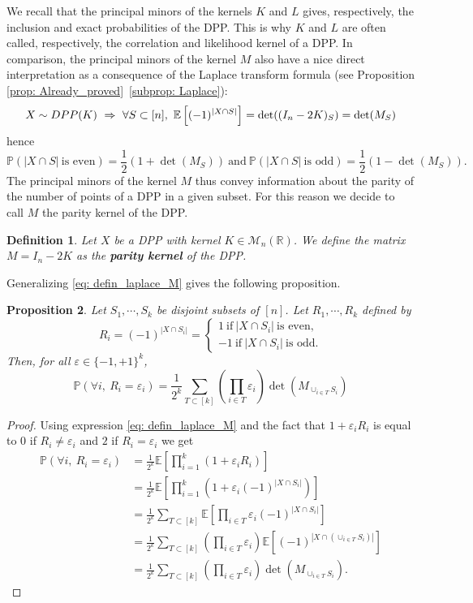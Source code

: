 \documentclass{article}
\numberwithin{equation}{section}
\renewcommand{\epsilon}{\varepsilon}
\newcommand{\bE}{\mathbb{E}}
\newcommand{\bR}{\mathbb{R}}
\newcommand{\cM}{\mathcal{M}}
\newcommand{\DPP}{\textnormal{DPP}}
\theoremstyle{plain}
\newtheorem{proposition}{Proposition}[section]
\newtheorem{definition}[proposition]{Definition}
\begin{document}
\noindent We recall that the principal minors of the kernels $K$ and $L$ gives, respectively, the inclusion and exact probabilities of the DPP. This is why $K$ and $L$ are often called, respectively, the correlation and likelihood kernel of a DPP. In comparison, the principal minors of the kernel $M$ also have a nice direct interpretation as a consequence of the Laplace transform formula (see Proposition \ref{prop: Already_proved}~\ref{subprop: Laplace}):
\begin{equation}\label{eq: defin_laplace_M}
X\sim \DPP(K)~\Rightarrow~\forall S\subset [n],~\bE\left[(-1)^{|X\cap S|}\right]=\det((I_n-2K)_S)=\det(M_S)
\end{equation}
hence
\[\mathbb{P}(|X\cap S|~\mbox{is even})= \frac{1}{2}(1+\det(M_S))~\mbox{and}~\mathbb{P}(|X\cap S|~\mbox{is odd})= \frac{1}{2}(1-\det(M_S)).\]
The principal minors of the kernel $M$ thus convey information about the parity of the number of points of a DPP in a given subset. For this reason we decide to call $M$ the parity kernel of the DPP. 
\begin{definition}
Let $X$ be a DPP with kernel $K\in\cM_n(\bR)$. We define the matrix $M=I_n - 2K$ as the \textbf{parity kernel} of the DPP.
\end{definition}
\noindent Generalizing \eqref{eq: defin_laplace_M} gives the following proposition.
\begin{proposition}\label{prop: General_parity}
Let $S_1,\cdots, S_k$ be disjoint subsets of $[n]$. Let $R_1,\cdots, R_k$ defined by
\[R_i=(-1)^{|X\cap S_i|}=\left\{\begin{array}{l} 1~\mbox{if}~|X\cap S_i|~\mbox{is even,}\\
-1~\mbox{if}~|X\cap S_i|~\mbox{is odd.}\end{array}
\right.\]
Then, for all $\epsilon\in\{-1, +1\}^k$,
\[\mathbb{P}(\forall i,~R_i=\epsilon_i)=\frac{1}{2^k}\sum_{T\subset [k]}\left(\prod_{i\in T}\epsilon_i\right)\det(M_{\cup_{i\in T}S_i})\]
\end{proposition}
\begin{proof}
Using expression \eqref{eq: defin_laplace_M} and the fact that $1+\epsilon_iR_i$ is equal to $0$ if $R_i\neq \epsilon_i$ and $2$ if $R_i = \epsilon_i$ we get
\begin{align*}
\mathbb{P}(\forall i,~R_i=\epsilon_i)&=\frac{1}{2^k}\bE\left[\prod_{i=1}^k\left(1+\epsilon_iR_i\right)\right]\\
&=\frac{1}{2^k}\bE\left[\prod_{i=1}^k\left(1+\epsilon_i(-1)^{|X\cap S_i|}\right)\right]\\
&=\frac{1}{2^k}\sum_{T\subset [k]}\bE\left[\prod_{i\in T}\epsilon_i(-1)^{|X\cap S_i|}\right]\\
&=\frac{1}{2^k}\sum_{T\subset [k]}\left(\prod_{i\in T}\epsilon_i\right)\bE\left[(-1)^{|X\cap (\cup_{i\in T}S_i)|}\right]\\
&=\frac{1}{2^k}\sum_{T\subset [k]}\left(\prod_{i\in T}\epsilon_i\right)\det(M_{\cup_{i\in T}S_i}).
\end{align*}
\end{proof}
\end{document}
